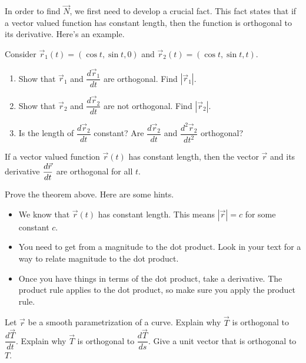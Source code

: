 In order to find $\vec N$, we first need to develop a crucial fact.  This fact states that if a vector valued function has constant length, then the function is orthogonal to its derivative. Here's an example. 

\begin{problem}
 Consider  $\vec r_1(t)=(\cos t, \sin t, 0)$ and $\vec r_2(t)=(\cos t, \sin t, t)$. 
\begin{enumerate}
 \item Show that $\vec r_1$ and $\dfrac{d\vec r_1}{dt}$ are orthogonal. Find $|\vec r_1|$.
 \item Show that $\vec r_2$ and $\dfrac{d\vec r_2}{dt}$ are not orthogonal. Find $|\vec r_2|$.
 \item Is the length of $\dfrac{d\vec r_2}{dt}$ constant? Are $\dfrac{d\vec r_2}{dt}$ and $\dfrac{d^2\vec r_2}{dt^2}$ orthogonal? 
\end{enumerate}
\end{problem}

\begin{theorem}\label{vector valued functions of constant length}
 If a vector valued function $\vec r(t)$ has constant length, then the vector $\vec r$ and its derivative $\displaystyle\frac{d\vec r}{dt}$ are orthogonal for all $t$. 
\end{theorem}

\begin{problem}
 Prove the theorem above. Here are some hints.
\begin{itemize}
 \item We know that $\vec r(t)$ has constant length. This means $|\vec r|=c$ for some constant $c$. 
 \item You need to get from a magnitude to the dot product. Look in your text for a way to relate magnitude to the dot product.
 \item Once you have things in terms of the dot product, take a derivative. The product rule applies to the dot product, so make sure you apply the product rule.
\end{itemize}
\end{problem}


\begin{problem}\label{T and N are orthogonal}
 Let $\vec r$ be a smooth parametrization of a curve.  Explain why $\vec T$ is orthogonal to $\dfrac{d\vec T}{dt}$. Explain why $\vec T$ is orthogonal to $\dfrac{d\vec T}{ds}$. Give a unit vector that is orthogonal to $T$.
\end{problem}

